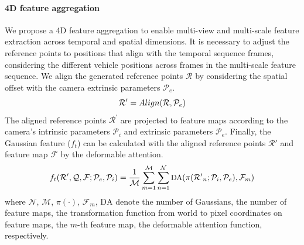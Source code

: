 \documentclass[journal]{IEEEtran}
\begin{document}
\paragraph{4D feature aggregation} 
We propose a 4D feature aggregation to enable multi-view and multi-scale feature extraction across temporal and spatial dimensions.
It is necessary to adjust the reference points to positions that align with the temporal sequence frames, considering the different vehicle positions across frames in the multi-scale feature sequence.
We align the generated reference points {\small $\mathcal{R}$} by considering the spatial offset with the camera extrinsic parameters {\small $\mathcal{P}_e$}.
\begin{equation}\small
    \mathcal{R^\prime} = Align(\mathcal{R},\mathcal{P}_e)
\end{equation}
The aligned reference points {\small $\mathcal{R^\prime}$} are projected to feature maps according to the camera’s intrinsic parameters {\small $\mathcal{P}_i$} and extrinsic parameters {\small $\mathcal{P}_e$}.
Finally, the Gaussian feature ($f_t$) can be calculated with the aligned reference points {\small $\mathcal{R'}$} and feature map {\small $\mathcal{F}$} by the deformable attention.
\begin{equation} \small
f_t(\mathcal{R'}, \mathcal{Q}, \mathcal{F}; \mathcal{P}_e, \mathcal{P}_i) = \frac{1}{\mathcal{M}} \sum_{m=1}^{\mathcal{M}} \sum_{n=1}^{\mathcal{N}} \text{DA}(\pi(\mathcal{R'}_n;\mathcal{P}_i, \mathcal{P}_e), \mathcal{F}_m)
\end{equation}
where {\small $\mathcal{N}$}, {\small $\mathcal{M}$}, $\pi(\cdot)$, $\mathcal{F}_m$, {\small $\text{DA}$} denote the number of Gaussians, the number of feature maps, the transformation function from world to pixel coordinates on feature maps, the $m$-th feature map, the deformable attention function, respectively.
\end{document}
